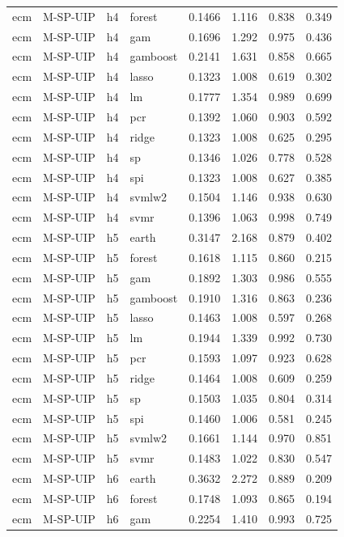 \begin{ThreePartTable}
\begin{longtable}[t]{llclcccc}
ecm & M-SP-UIP & h4 & forest & 0.1466 & 1.116 & 0.838 & 0.349\\
ecm & M-SP-UIP & h4 & gam & 0.1696 & 1.292 & 0.975 & 0.436\\
ecm & M-SP-UIP & h4 & gamboost & 0.2141 & 1.631 & 0.858 & 0.665\\
ecm & M-SP-UIP & h4 & lasso & 0.1323 & 1.008 & 0.619 & 0.302\\
ecm & M-SP-UIP & h4 & lm & 0.1777 & 1.354 & 0.989 & 0.699\\
ecm & M-SP-UIP & h4 & pcr & 0.1392 & 1.060 & 0.903 & 0.592\\
ecm & M-SP-UIP & h4 & ridge & 0.1323 & 1.008 & 0.625 & 0.295\\
ecm & M-SP-UIP & h4 & sp & 0.1346 & 1.026 & 0.778 & 0.528\\
ecm & M-SP-UIP & h4 & spi & 0.1323 & 1.008 & 0.627 & 0.385\\
ecm & M-SP-UIP & h4 & svmlw2 & 0.1504 & 1.146 & 0.938 & 0.630\\
ecm & M-SP-UIP & h4 & svmr & 0.1396 & 1.063 & 0.998 & 0.749\\
\addlinespace
ecm & M-SP-UIP & h5 & earth & 0.3147 & 2.168 & 0.879 & 0.402\\
ecm & M-SP-UIP & h5 & forest & 0.1618 & 1.115 & 0.860 & 0.215\\
ecm & M-SP-UIP & h5 & gam & 0.1892 & 1.303 & 0.986 & 0.555\\
ecm & M-SP-UIP & h5 & gamboost & 0.1910 & 1.316 & 0.863 & 0.236\\
ecm & M-SP-UIP & h5 & lasso & 0.1463 & 1.008 & 0.597 & 0.268\\
ecm & M-SP-UIP & h5 & lm & 0.1944 & 1.339 & 0.992 & 0.730\\
ecm & M-SP-UIP & h5 & pcr & 0.1593 & 1.097 & 0.923 & 0.628\\
ecm & M-SP-UIP & h5 & ridge & 0.1464 & 1.008 & 0.609 & 0.259\\
ecm & M-SP-UIP & h5 & sp & 0.1503 & 1.035 & 0.804 & 0.314\\
ecm & M-SP-UIP & h5 & spi & 0.1460 & 1.006 & 0.581 & 0.245\\
ecm & M-SP-UIP & h5 & svmlw2 & 0.1661 & 1.144 & 0.970 & 0.851\\
ecm & M-SP-UIP & h5 & svmr & 0.1483 & 1.022 & 0.830 & 0.547\\
\addlinespace
ecm & M-SP-UIP & h6 & earth & 0.3632 & 2.272 & 0.889 & 0.209\\
ecm & M-SP-UIP & h6 & forest & 0.1748 & 1.093 & 0.865 & 0.194\\
ecm & M-SP-UIP & h6 & gam & 0.2254 & 1.410 & 0.993 & 0.725\\

\end{longtable}
\end{ThreePartTable}
